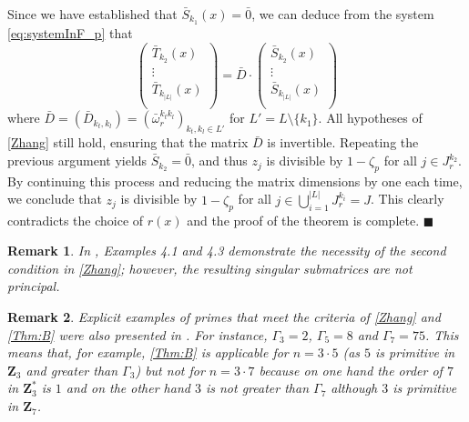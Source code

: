 \documentclass[10pt,a4paper]{amsart}
\newtheorem{remark}{Remark}
\newenvironment{proofofB}{{\bf {Proof of Theorem \ref{Thm:B}.} }}{\hfill $\blacksquare$ \\}
\def\Z{\mathbf{Z}}
\begin{document}
\begin{proofofB}
Since we have established that $\bar{S}_{k_1}(x)=\bar{0}$, we can deduce from the system \eqref{eq:systemInF_p} that
\begin{equation}
   \left( \begin{matrix}
    \bar{T}_{k_2}(x)\\
    \vdots\\
    \bar{T}_{k_{|L|}}(x)\\
\end{matrix}
\right)
= \bar{D} \cdot  \left( \begin{matrix}
    \bar{S}_{k_2}(x)\\
    \vdots\\
    \bar{S}_{k_{|L|}}(x)\\
\end{matrix}
\right) 
\end{equation}
where $\bar{D}= (\bar{D}_{k_t,k_l})=(\bar{\omega}_r^{k_tk_l})_{k_t, k_l \in L'}$  for $L'= L \setminus \{ k_1 \}$. All hypotheses of \autoref{Zhang} still hold, ensuring that the matrix $\bar{D}$ is invertible. Repeating the previous argument yields $\bar{S}_{k_2} = \bar{0}$, and thus   $z_j$ is divisible by $1 - \zeta_p$ for all $j \in J_r^{k_2}$. By continuing this process and reducing the matrix dimensions by one each time, we conclude that $z_j$ is divisible by $1 - \zeta_p$ for all $j \in \bigcup_{i=1}^{|L|} J_r^{k_i} = J$. This clearly contradicts the choice of $r(x)$ and the proof of the 
theorem is complete.
\end{proofofB}


\begin{remark}
    In \cite{Zhang}, Examples 4.1 and 4.3 demonstrate the necessity of the second condition in \autoref{Zhang}; however, the resulting singular submatrices are not principal.
\end{remark}

\begin{remark}
    Explicit examples of primes that meet the criteria of \autoref{Zhang} and \autoref{Thm:B} were also presented in \cite{Zhang}. For instance, 
    $\Gamma_3= 2$, $\Gamma_5=8$  and $\Gamma_7=75$. This means that, for example,  \autoref{Thm:B} is applicable for $n=3\cdot 5$  (as $5$ is primitive in $\Z_3$ and greater than $\Gamma_3$) but not for $n= 3 \cdot 7$ because on one hand the order of $7$ in $\Z_3^*$ is $1$  and  on the other hand  $3$ is not greater than $\Gamma_7$ 
    although  $3$ is primitive in $\Z_7$.
\end{remark}
\end{document}
